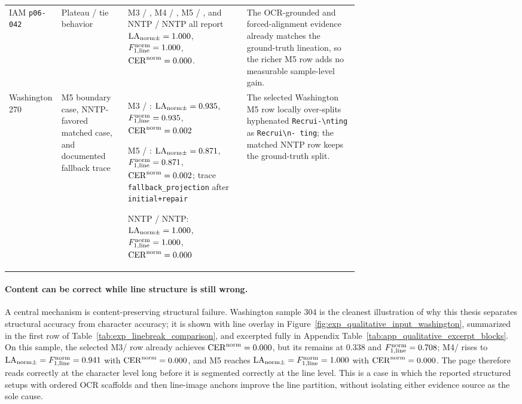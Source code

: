 \begin{table}[!htbp]
\begin{tabularx}{\linewidth}{@{}>{\raggedright\arraybackslash}p{0.15\linewidth}>{\raggedright\arraybackslash}p{0.19\linewidth}>{\raggedright\arraybackslash}p{0.34\linewidth}Y@{}}
    \addlinespace[0.35em]
    IAM \texttt{p06-042} & Plateau / tie behavior & M3 / \GPTFiveMarchShort{}, M4 / \GPTFiveMarchShort{}, M5 / \GPTFiveShort{}, and NNTP / NNTP all report \(\mathrm{LA}_{\mathrm{norm}\pm}=1.000\), \(F_{1,\mathrm{line}}^{\mathrm{norm}}=1.000\), \(\mathrm{CER}^{\mathrm{norm}}=0.000\). & The OCR-grounded and forced-alignment evidence already matches the ground-truth lineation, so the richer M5 row adds no measurable sample-level gain. \\
    \addlinespace[0.35em]
    Washington 270 & M5 boundary case, NNTP-favored matched case, and documented fallback trace & M3 / \GPTFiveMarchShort{}: \(\mathrm{LA}_{\mathrm{norm}\pm}=0.935\), \(F_{1,\mathrm{line}}^{\mathrm{norm}}=0.935\), \(\mathrm{CER}^{\mathrm{norm}}=0.002\)\par M5 / \QwenThirtyTwoShort{}: \(\mathrm{LA}_{\mathrm{norm}\pm}=0.871\), \(F_{1,\mathrm{line}}^{\mathrm{norm}}=0.871\), \(\mathrm{CER}^{\mathrm{norm}}=0.002\); trace \texttt{fallback\_projection} after \texttt{initial+repair}\par NNTP / NNTP: \(\mathrm{LA}_{\mathrm{norm}\pm}=1.000\), \(F_{1,\mathrm{line}}^{\mathrm{norm}}=1.000\), \(\mathrm{CER}^{\mathrm{norm}}=0.000\) & The selected Washington M5 row locally over-splits hyphenated \texttt{Recrui-\textbackslash nting} as \texttt{Recrui\textbackslash n- ting}; the matched NNTP row keeps the ground-truth split. \\
    \bottomrule
  \end{tabularx}
\end{table}

\FloatBarrier

\paragraph{Content can be correct while line structure is still wrong.}
A central mechanism is content-preserving structural failure. Washington sample 304 is the cleanest illustration of why this thesis separates structural accuracy from character accuracy; it is shown with line overlay in Figure~\ref{fig:exp_qualitative_input_washington}, summarized in the first row of Table~\ref{tab:exp_linebreak_comparison}, and excerpted fully in Appendix Table~\ref{tab:app_qualitative_excerpt_blocks}. On this sample, the selected M3/\GPTFiveMarchShort{} row already achieves \(\mathrm{CER}^{\mathrm{norm}}=0.000\), but its \LANormCombined{} remains at \(0.338\) and \(F_{1,\mathrm{line}}^{\mathrm{norm}}=0.708\); M4/\GPTFiveMarchShort{} rises to \(\mathrm{LA}_{\mathrm{norm}\pm}=F_{1,\mathrm{line}}^{\mathrm{norm}}=0.941\) with \(\mathrm{CER}^{\mathrm{norm}}=0.000\), and M5 reaches \(\mathrm{LA}_{\mathrm{norm}\pm}=F_{1,\mathrm{line}}^{\mathrm{norm}}=1.000\) with \(\mathrm{CER}^{\mathrm{norm}}=0.000\). The page therefore reads correctly at the character level long before it is segmented correctly at the line level. This is a case in which the reported structured setups with ordered OCR scaffolds and then line-image anchors improve the line partition, without isolating either evidence source as the sole cause.


